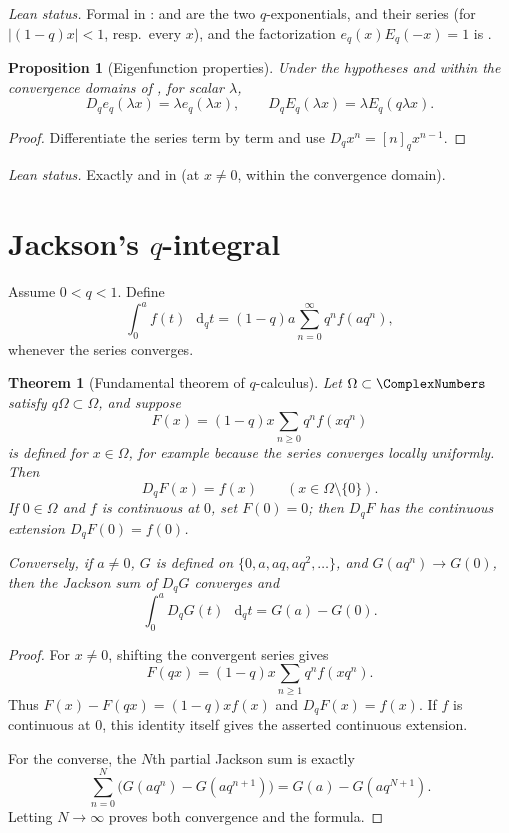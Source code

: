 \documentclass[11pt,a4paper,oneside,openany]{book}
\newtheorem{theorem}{Theorem}[chapter]
\newtheorem{proposition}[proposition]{Proposition}
\theoremstyle{definition}
\theoremstyle{remark}
\newcommand{\JacksonDifferential}[2]{\mathop{}\!\mathrm d_{#1}#2}
\begin{document}
\emph{Lean status.}  Formal in :  and
 are the two $q$-exponentials,  and
 their series (for $|(1-q)x|<1$, resp.\ every $x$), and the
factorization $e_q(x)E_q(-x)=1$ is .


\begin{proposition}[Eigenfunction properties]\label{prop:qexp-eigen}
Under the hypotheses and within the convergence domains of , for scalar $\lambda$,
\[
 D_qe_q(\lambda x)=\lambda e_q(\lambda x),
 \qquad
 D_qE_q(\lambda x)=\lambda E_q(q\lambda x).
\]
\end{proposition}

\begin{proof}
Differentiate the series term by term and use $D_qx^n=[n]_qx^{n-1}$.
\end{proof}

\emph{Lean status.}  Exactly  and  in
 (at $x\ne0$, within the convergence domain).


\section{Jackson's \texorpdfstring{$q$}{q}-integral}

Assume $0<q<1$.  Define
\[
 \int_0^a f(t)\,\JacksonDifferential{q}{t}
 =(1-q)a\sum_{n=0}^{\infty}q^nf(aq^n),
\]
whenever the series converges.

\begin{theorem}[Fundamental theorem of $q$-calculus]\label{thm:q-fundamental}
Let $\Omega\subset\ComplexNumbers$ satisfy $q\Omega\subset\Omega$, and
suppose
\[
 F(x)=(1-q)x\sum_{n\ge0}q^nf(xq^n)
\]
is defined for $x\in\Omega$, for example because the series converges locally
uniformly.  Then
\[
 D_qF(x)=f(x)\qquad(x\in\Omega\setminus\{0\}).
\]
If $0\in\Omega$ and $f$ is continuous at $0$, set $F(0)=0$; then $D_qF$
has the continuous extension $D_qF(0)=f(0)$.

Conversely, if $a\ne0$, $G$ is defined on
$\{0,a,aq,aq^2,\ldots\}$, and $G(aq^n)\to G(0)$, then the Jackson sum of
$D_qG$ converges and
\[
 \int_0^aD_qG(t)\,\JacksonDifferential{q}{t}=G(a)-G(0).
\]
\end{theorem}

\begin{proof}
For $x\ne0$, shifting the convergent series gives
\[
 F(qx)=(1-q)x\sum_{n\ge1}q^nf(xq^n).
\]
Thus $F(x)-F(qx)=(1-q)xf(x)$ and $D_qF(x)=f(x)$.  If $f$ is
continuous at $0$, this identity itself gives the asserted continuous
extension.

For the converse, the $N$th partial Jackson sum is exactly
\[
 \sum_{n=0}^{N}\bigl(G(aq^n)-G(aq^{n+1})\bigr)
 =G(a)-G(aq^{N+1}).
\]
Letting $N\to\infty$ proves both convergence and the formula.
\end{proof}
\end{document}
